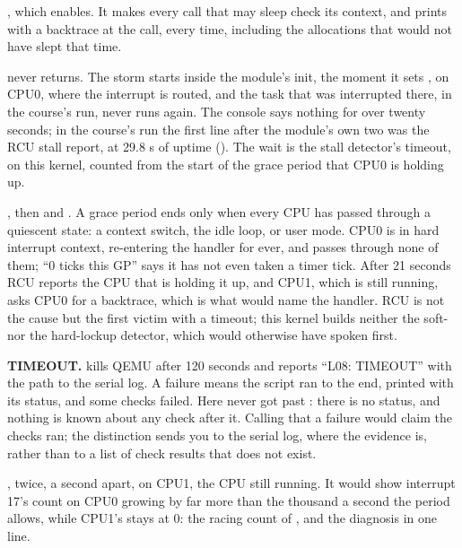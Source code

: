  , which  enables. It makes every
call that may sleep check its context, and prints  with a backtrace at the call, every time, including the allocations that would not have
slept that time.


  never returns. The storm starts inside the module's init, the moment it
sets , on CPU0, where the interrupt is routed, and the task that was interrupted there,
 in the course's run, never runs again. The console says nothing for over twenty
seconds; in the course's run the first line after the module's own two was the RCU stall report, at
29.8 s of uptime (). The wait is the stall detector's timeout,
 on this kernel, counted from the start of the grace period
that CPU0 is holding up.

 , then  and . A grace period ends only when every CPU has
passed through a quiescent state: a context switch, the idle loop, or user mode. CPU0 is in hard
interrupt context, re-entering the handler for ever, and passes through none of them; ``0 ticks
this GP'' says it has not even taken a timer tick. After 21 seconds RCU reports the CPU that is
holding it up, and CPU1, which is still running, asks CPU0 for a backtrace, which is what would name
the handler. RCU is not the cause but the first victim with a timeout; this kernel builds neither
the soft- nor the hard-lockup detector, which would otherwise have spoken first.

 \textbf{TIMEOUT.}  kills QEMU after 120 seconds and reports ``L08:
TIMEOUT'' with the path to the serial log. A failure means the script ran to the end, printed
 with its status, and some checks failed. Here  never got past
: there is no status, and nothing is known about any check after it. Calling that a
failure would claim the checks ran; the distinction sends you to the serial log, where the evidence
is, rather than to a list of check results that does not exist.

 , twice, a second apart, on CPU1, the CPU still
running. It would show interrupt 17's count on CPU0 growing by far more than the thousand a second
the period allows, while CPU1's stays at 0: the racing count of , and the
diagnosis in one line.

